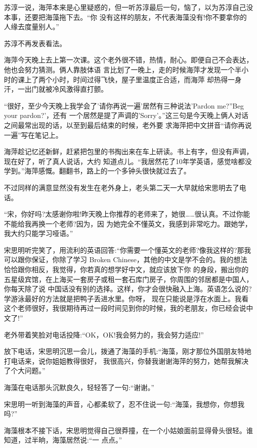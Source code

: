 \documentclass[11pt,a4paper,onecolumn]{article}
\begin{document}
苏淳一说，海萍本来是心里疑惑的，但一听苏淳最后一句，恼了，以为苏淳自己没本事，还要把海藻拖下去。``你
没有这样的朋友，不代表海藻没有!你不要拿你的人缘去度量别人。''

苏淳不再发表看法。

海萍今天晚上去上第一次课。这个老外很不错，热情，耐心。即便自己不会表达，他也会努力猜测。俩人靠肢体语
言比划了一晚上，走的时候海萍才发现一个半小时的课上了两个小时，时间过得飞快，屋子里温度正合适，而海萍
却热得一身汗，一出门就被冷风激得直打颤。

``很好，至少今天晚上我学会了'请你再说一遍'居然有三种说法\myrule 'Pardon me?''Beg your pardon?'，还有
一个居然是提了声调的'Sorry'。''这三句是今天晚上俩人对话之间最常出现的话，以至到最后结束的时候，老外要
求海萍把中文拼音``请你再说一遍''写在笔记上。

海萍趁记忆还新鲜，赶紧把包里的书掏出来在车上研读。书上有字，但没有声调，现在好了，听了真人说话，大约
知道点儿。``我居然花了10年学英语，感觉啥都没学到。''海萍感慨。翻翻书，路上的一个多钟头很快就过去了。

不过同样的满意显然没有发生在老外身上，老头第二天一大早就给宋思明去了电话。

``宋，你好吗?太感谢你啦!昨天晚上你推荐的老师来了，她很……很认真。不过你能不能给我再换一个老师?因为，因
为她完全不懂英文，我感到非常吃力。跟她学，我大约只能学习哑语。''

宋思明听完笑了，用流利的英语回答:``你需要一个懂英文的老师?像我这样的?那我可以跟你保证，你除了学习
Broken Chinese，其他的中文是学不会的。我的想法恰恰跟你相反，我觉得，你若真的想学好中文，就应该放下你
的身段，搬出你的五星级宾馆，在上海买一套房子或租一套石库门房子，你周围的邻居都是中国人，你每天除了说
中国话没有别的选择。这样，你才会很快融入上海。英语怎么说的?学游泳最好的方法就是把鸭子丢进水里。你呀，
现在只能说是浮在水面上。我看这个老师很好，我很期待再过一段时间见到你的时候，我的老朋友，你已经会说中
文了!''

老外带着笑脸对电话投降:``OK，OK!我会努力的，我会努力适应!''

放下电话，宋思明沉思一会儿，拨通了海藻的手机:``海藻，刚才那位外国朋友特地打电话来，说你姐姐教得很好，
我很高兴，你替我谢谢海萍的努力，她帮我解决了个大问题。''

海藻在电话那头沉默良久，轻轻答了一句:``谢谢。''

宋思明一听到海藻的声音，心都柔软了，忍不住说一句:``海藻，我想你，你想我吗?''

海藻根本不接下话，宋思明觉得自己很莽撞，在一个小姑娘面前显得骨头很轻。谁知道，过半晌，海藻居然说:``一
点点。''
\end{document}
